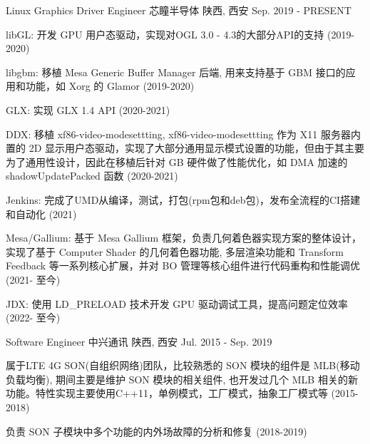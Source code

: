 
\begin{cventries}
  \cventry
    {Linux Graphics Driver Engineer} %
    {芯瞳半导体} %
    {陕西, 西安} %
    {Sep. 2019 - PRESENT} %
    {
      \begin{cvitems} %
        \item {libGL: 开发 GPU 用户态驱动，实现对OGL 3.0 - 4.3的大部分API的支持 (2019-2020)}
        \item {libgbm: 移植 Mesa Generic Buffer Manager 后端, 用来支持基于 GBM 接口的应用和功能，如 Xorg 的 Glamor (2019-2020)}
        \item {GLX: 实现 GLX 1.4 API (2020-2021)}
        \item {DDX: 移植 xf86-video-modesettting, xf86-video-modesettting 作为 X11 服务器内置的 2D 显示用户态驱动，实现了大部分通用显示模式设置的功能，但由于其主要为了通用性设计，因此在移植后针对 GB 硬件做了性能优化，如 DMA 加速的 shadowUpdatePacked 函数 (2020-2021)}
        \item {Jenkins: 完成了UMD从编译，测试，打包(rpm包和deb包)，发布全流程的CI搭建和自动化 (2021)}
        \item {Mesa/Gallium: 基于 Mesa Gallium 框架，负责几何着色器实现方案的整体设计，实现了基于 Computer Shader 的几何着色器功能, 多层渲染功能和 Transform Feedback 等一系列核心扩展，并对 BO 管理等核心组件进行代码重构和性能调优 (2021- 至今)}
        \item {JDX: 使用 LD\_PRELOAD 技术开发 GPU 驱动调试工具，提高问题定位效率 (2022- 至今)}
      \end{cvitems}
    }

  \cventry
    {Software Engineer} %
    {中兴通讯} %
    {陕西, 西安} %
    {Jul. 2015 - Sep. 2019} %
    {
      \begin{cvitems} %
      \item {属于LTE 4G SON(自组织网络)团队，比较熟悉的 SON 模块的组件是 MLB(移动负载均衡), 期间主要是维护 SON 模块的相关组件, 也开发过几个 MLB 相关的新功能。特性实现主要使用C++11，单例模式，工厂模式，抽象工厂模式等 (2015-2018)}
      \item {负责 SON 子模块中多个功能的内外场故障的分析和修复 (2018-2019)}
      \end{cvitems}
    }
\end{cventries}
